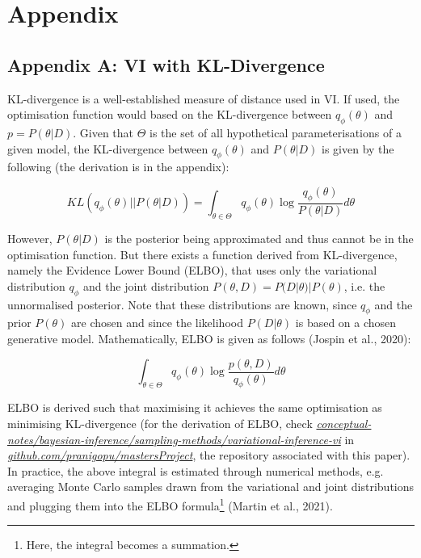 \documentclass[conference]{IEEEtran}
\begin{document}
\section*{Appendix}
\subsection*{Appendix A: VI with KL-Divergence}
KL-divergence is a well-established measure of distance used in VI. If used, the optimisation function would based on the KL-divergence between $q_\phi(\theta)$ and $p = P(\theta|D)$. Given that $\Theta$ is the set of all hypothetical parameterisations of a given model, the KL-divergence between $q_\phi(\theta)$ and $P(\theta|D)$ is given by the following (the derivation is in the appendix):

\begin{equation*}
	KL(q_\phi(\theta) || P(\theta|D))
	= \int_{\theta \in \Theta} q_\phi(\theta) \log \frac{q_\phi(\theta)}{P(\theta|D)} d\theta
\end{equation*}

However, $P(\theta|D)$ is the posterior being approximated and thus cannot be in the optimisation function. But there exists a function derived from KL-divergence, namely the Evidence Lower Bound (ELBO), that uses only the variational distribution $q_\phi$ and the joint distribution $P(\theta, D) = P(D|\theta)|P(\theta)$, i.e. the unnormalised posterior. Note that these distributions are known, since $q_\phi$ and the prior $P(\theta)$ are chosen and since the likelihood $P(D|\theta)$ is based on a chosen generative model. Mathematically, ELBO is given as follows (Jospin et al., 2020):

\begin{equation*}
	\int_{\theta \in \Theta} q_\phi(\theta) \log \frac{p(\theta, D)}{q_\phi(\theta)} d\theta
\end{equation*}

ELBO is derived such that maximising it achieves the same optimisation as minimising KL-divergence (for the derivation of ELBO, check \href{https://github.com/pranigopu/mastersProject/tree/main/conceptual-notes/bayesian-inference/sampling-methods/variational-inference-vi}{\textit{conceptual-notes/bayesian-inference/sampling-methods/variational-inference-vi}} in \href{https://github.com/pranigopu/mastersProject}{\textit{github.com/pranigopu/mastersProject}}, the repository associated with this paper). In practice, the above integral is estimated through numerical methods, e.g. averaging Monte Carlo samples drawn from the variational and joint distributions and plugging them into the ELBO formula\footnote{Here, the integral becomes a summation.} (Martin et al., 2021).
\end{document}
